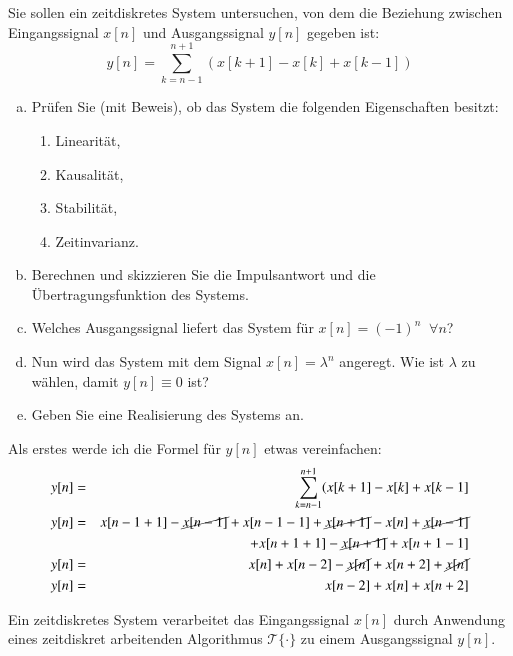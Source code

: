 \begin{uebsp}
\begin{Exercise}
Sie sollen ein zeitdiskretes System untersuchen, von dem die Beziehung zwischen
Eingangssignal $x[n]$ und Ausgangssignal $y[n]$ gegeben ist:
\[y[n]=\sum_{k=n-1}^{n+1}(x[k+1]-x[k]+x[k-1])\]
\begin{enumerate}[a)]
    \item Prüfen Sie (mit Beweis), ob das System die folgenden Eigenschaften besitzt:
        \begin{enumerate}[1)]
            \item Linearität,
            \item Kausalität,
            \item Stabilität,
            \item Zeitinvarianz.
        \end{enumerate}
    \item Berechnen und skizzieren Sie die Impulsantwort und die Übertragungsfunktion 
        des Systems.
    \item Welches Ausgangssignal liefert das System für $x[n] = (-1)^n\;\;\forall n$?
    \item Nun wird das System mit dem Signal $x[n] = \lambda^n$ angeregt.
        Wie ist $\lambda$ zu wählen, damit $y[n] \equiv 0$ ist?
    \item Geben Sie eine Realisierung des Systems an.
\end{enumerate}
\end{Exercise}
\begin{Answer}
    Als erstes werde ich die Formel für $y[n]$ etwas vereinfachen:
    \begin{eqnarray*}
        y[n]&=&\sum_{k=n-1}^{n+1}(x[k+1]-x[k]+x[k-1]\\
        y[n]&=&x[n-1+1]-\cancel{x[n-1]}+x[n-1-1]+\cancel{x[n+1]}-x[n]+\cancel{x[n-1]}\\
            &&\;\;+x[n+1+1]-\cancel{x[n+1]}+x[n+1-1]\\
        y[n]&=&x[n]+x[n-2]-\cancel{x[n]}+x[n+2]+\cancel{x[n]}\\
        y[n]&=&x[n-2]+x[n]+x[n+2]\\
    \end{eqnarray*}
    \begin{uebsp_theory}
        Ein zeitdiskretes System verarbeitet das Eingangssignal $x[n]$ durch
        Anwendung eines zeitdiskret arbeitenden Algorithmus
        $\mathcal{T}\{\cdot\}$ zu einem Ausgangssignal $y[n]$.
        \begin{center}

\end{center}
\end{uebsp_theory}
\end{Answer}
\end{uebsp}
